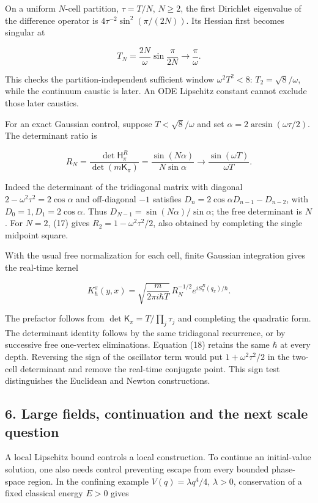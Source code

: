 \documentclass[11pt,a4paper]{article}
\begin{document}
On a uniform \(N\)-cell partition, \(\tau=T/N\), \(N\ge2\), the first
Dirichlet eigenvalue of the difference operator is
\(4\tau^{-2}\sin^2(\pi/(2N))\). Its Hessian first becomes singular at

\[
 T_N=\frac{2N}{\omega}\sin\frac{\pi}{2N}
       \longrightarrow\frac\pi\omega.
 \tag{16}
\]

This checks the partition-independent sufficient window
\(\omega^2T^2<8\): \(T_2=\sqrt8/\omega\), while the continuum caustic is
later. An ODE Lipschitz constant cannot exclude those later caustics.

For an exact Gaussian control, suppose \(T<\sqrt8/\omega\) and set
\(\alpha=2\arcsin(\omega\tau/2)\). The determinant ratio is

\[
 R_N=\frac{\det\mathsf H_\pi^R}{\det(m\mathsf K_\pi)}
     =\frac{\sin(N\alpha)}{N\sin\alpha}
       \longrightarrow\frac{\sin(\omega T)}{\omega T}.
 \tag{17}
\]

Indeed the determinant of the tridiagonal matrix with diagonal
\(2-\omega^2\tau^2=2\cos\alpha\) and off-diagonal \(-1\) satisfies
\(D_n=2\cos\alpha D_{n-1}-D_{n-2}\), with \(D_0=1,D_1=2\cos\alpha\).
Thus \(D_{N-1}=\sin(N\alpha)/\sin\alpha\); the free determinant is
\(N\). For \(N=2\), (17) gives \(R_2=1-\omega^2\tau^2/2\), also obtained
by completing the single midpoint square.

With the usual free normalization for each cell, finite Gaussian
integration gives the real-time kernel

\[
 K^\pi_\hbar(y,x)=
 \sqrt{\frac{m}{2\pi i\hbar T}}\,R_N^{-1/2}
           e^{iS_\pi^R(q_\pi)/\hbar}.
 \tag{18}
\]

The prefactor follows from \(\det\mathsf K_\pi=T/\prod_j\tau_j\) and
completing the quadratic form. The determinant identity follows by the
same tridiagonal recurrence, or by successive free one-vertex
eliminations. Equation (18) retains the same \(\hbar\) at every depth.
Reversing the sign of the oscillator term would put
\(1+\omega^2\tau^2/2\) in the two-cell determinant and remove the
real-time conjugate point. This sign test distinguishes the Euclidean
and Newton constructions.

\subsection{6. Large fields, continuation and the next scale
question}\label{large-fields-continuation-and-the-next-scale-question}

A local Lipschitz bound controls a local construction. To continue an
initial-value solution, one also needs control preventing escape from
every bounded phase-space region. In the confining example
\(V(q)=\lambda q^4/4\), \(\lambda>0\), conservation of a fixed classical
energy \(E>0\) gives
\end{document}

